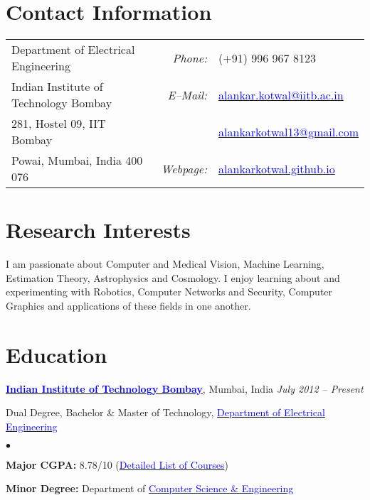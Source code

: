\documentclass[margin,line]{res}
\newenvironment{list1}{
  \begin{list}{\ding{113}}{%
      \setlength{\itemsep}{0in}
      \setlength{\parsep}{0in} \setlength{\parskip}{0in}
      \setlength{\topsep}{0in} \setlength{\partopsep}{0in} 
      \setlength{\leftmargin}{0.17in}}}{\end{list}}
\newenvironment{list2}{
  \begin{list}{$\bullet$}{%
      \setlength{\itemsep}{0in}
      \setlength{\parsep}{0in} \setlength{\parskip}{0in}
      \setlength{\topsep}{0in} \setlength{\partopsep}{0in} 
      \setlength{\leftmargin}{0.2in}}}{\end{list}}
\begin{document}

\begin{resume}
\section{\sc Contact Information}
\vspace{.05in}
\begin{tabular}{@{}p{2.9in}p{.5in}p{3in}}
Department of Electrical Engineering & \multicolumn{1}{r}{\it Phone:}  &(+91) 996 967 8123 \\            
Indian Institute of Technology Bombay &\multicolumn{1}{r}{\it E--Mail:}& \href{mailto:alankar.kotwal@iitb.ac.in}{\textcolor{blue}{alankar.kotwal@iitb.ac.in}}\\ 
281, Hostel 09, IIT Bombay & & \href{mailto:alankarkotwal13@gmail.com}{\textcolor{blue}{alankarkotwal13@gmail.com}}\\ 

Powai, Mumbai, India 400 076 & \multicolumn{1}{r}{\it Webpage:} &\href{alankarkotwal.github.io}{\textcolor{blue}{alankarkotwal.github.io}} \\     
\end{tabular}

\section{\sc Research Interests}
I am passionate about Computer and Medical Vision, Machine Learning, Estimation Theory, Astrophysics and Cosmology. I enjoy learning about and experimenting with Robotics, Computer Networks and Security, Computer Graphics and applications of these fields in one another.

\section{\sc Education}
{\bf \href{http://www.iitb.ac.in/}{\textcolor{blue}{Indian Institute of Technology Bombay}}}, Mumbai, India \hfill {\it July 2012 -- Present}\\
\vspace*{-.1in}
\begin{list1}
\item[] Dual Degree, Bachelor \& Master of Technology, \href{http://www.ee.iitb.ac.in/}{\textcolor{blue}{Department of Electrical Engineering}} 
\begin{list2}
\vspace*{.05in}
\item \textbf{Major CGPA:} 8.78/10 (\hyperlink{crselst}{\textcolor{blue}{Detailed List of Courses}})
\item \textbf{Minor Degree:}  Department of \href{www.cse.iitb.ac.in}{\textcolor{blue}{Computer Science \& Engineering}}
\end{list2}
\end{list1}


\end{resume}
\end{document}
